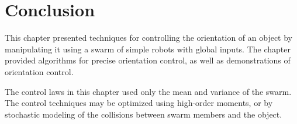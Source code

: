 \section{Conclusion}\label{sec:conclusion}


This chapter presented techniques for controlling the orientation of an object by manipulating it using a swarm of simple robots with global inputs.
The chapter provided algorithms for precise orientation control, as well as demonstrations of orientation control. 


The control laws in this chapter used only the mean and variance of the swarm.  The control techniques may be optimized using high-order moments, or by stochastic modeling of the collisions between swarm members and the object.


